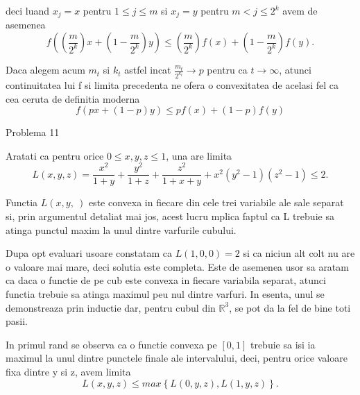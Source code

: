 \documentclass[a4paper,12pt,oneside]{report}
\begin{document}
deci luand \(x_{j} = x\) pentru \(1\leq j\leq m\) si \(x_{j} = y\) pentru \(m< j\leq 2^{k}\) avem de asemenea
\begin{displaymath}
  f\left ( \left ( \frac{m}{2^{k}} \right )x + \left ( 1 - \frac{m}{2^{k}} \right )y \right )\leq \left ( \frac{m}{2^{k}} \right )f\left ( x \right ) + \left ( 1 - \frac{m}{2^{k}} \right )f\left ( y \right ). 
\end{displaymath}

Daca alegem acum \(m_{t}\) si \(k_{t}\) astfel incat \(\frac{m_{t}}{2^{k_{t}}} \rightarrow p\) pentru ca \(t \rightarrow \infty\), atunci continuitatea lui f si limita precedenta ne ofera o convexitatea de acelasi fel ca cea ceruta de definitia moderna 
\begin{displaymath}
  f\left ( px + \left ( 1 - p \right )y \right ) \leq  pf\left ( x \right ) + \left ( 1 - p \right )f\left ( y \right )
\end{displaymath}


Problema 11

	Aratati ca pentru orice \(0\leq x , y , z \leq 1\), una are limita
\begin{displaymath}
  L\left ( x , y , z \right ) = \frac{x^{2}}{1 + y} + \frac{y^{2}}{1 + z} + \frac{z^{2}}{1 + x+ y} + x^{2} \left ( y^{2} - 1 \right )\left ( z^{2} - 1 \right ) \leq 2.
\end{displaymath}

Functia \(L\left ( x,y,\ \right )\) este convexa in fiecare din cele trei variabile ale sale separat si, prin argumentul detaliat mai jos, acest lucru mplica faptul ca L trebuie sa atinga punctul maxim  la unul dintre varfurile cubului. 

Dupa opt evaluari usoare constatam ca \(L \left ( 1,0,0 \right ) = 2\) si ca niciun alt colt nu are o valoare mai mare, deci solutia este completa. Este de asemenea usor sa aratam ca daca o functie de pe cub este convexa in fiecare variabila separat, atunci functia trebuie sa atinga maximul peu nul dintre varfuri. In esenta, unul se demonstreaza prin inductie dar, pentru cubul din \(\mathbb{R}^{3}\), se pot da la fel de bine toti pasii.  

In primul rand se observa ca o functie convexa pe \(\left [ 0 , 1 \right ]\) trebuie sa isi ia maximul la unul dintre punctele finale ale intervalului, deci, pentru orice valoare fixa dintre y si z, avem limita 
\begin{displaymath}
  L\left ( x,y,z \right )\leq max \left \{ L\left ( 0,y,z \right ), L\left ( 1,y,z \right ) \right \}.
\end{displaymath}
\end{document}
